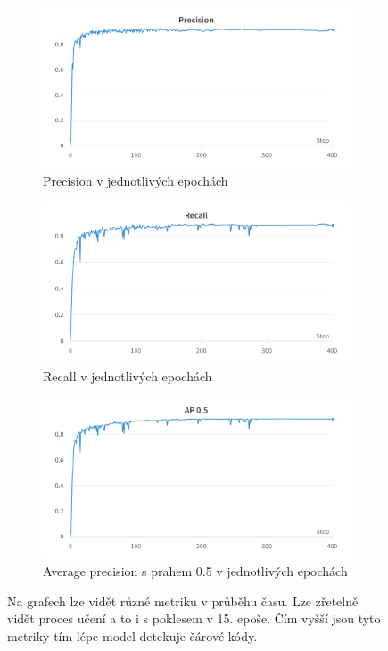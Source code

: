 \begin{figure}[h]\centering
    \centering
    \begin{subfigure}{0.6\textwidth}
    \includegraphics[width=0.95\linewidth]{obrazky-figures/wbprecision.png}\hfill
    \caption{Precision v jednotlivých epochách}
    \end{subfigure}
    \begin{subfigure}{0.6\textwidth}
    \includegraphics[width=0.95\linewidth]{obrazky-figures/wbrecall.png}\hfill
    \caption{Recall v jednotlivých epochách}
    \end{subfigure}
    \begin{subfigure}{0.6\textwidth}
    \includegraphics[width=0.95\linewidth]{obrazky-figures/wbap.png}\hfill
    \caption{Average precision s prahem 0.5 v jednotlivých epochách}
    \end{subfigure}
    \caption{Na grafech lze vidět různé metriku v průběhu času. Lze zřetelně vidět proces učení a to i s poklesem v 15. epoše. Čím vyšší jsou tyto metriky tím lépe model detekuje čárové kódy.}
    \label{precall1}
\end{figure}
\pagebreak

